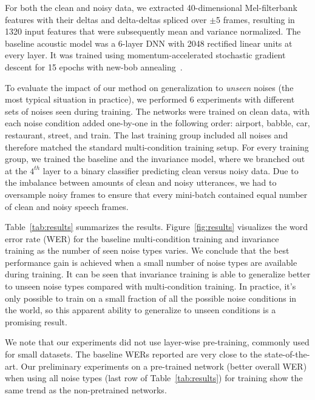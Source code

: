 \documentclass[a4paper]{article}
\begin{document}
For both the clean and noisy data, we extracted 40-dimensional Mel-filterbank features with their deltas and 
delta-deltas spliced over $\pm$5 frames, resulting in 1320 input 
features that were subsequently mean and variance normalized. The baseline
acoustic model was a 6-layer 
DNN with 2048 rectified linear units at every layer. It was trained using 
momentum-accelerated stochastic gradient descent for 15 epochs with new-bob 
annealing~\citep[the learning rate is halfed if no improvement on the validation set, as in][]{morgan1995continuous,sainath2011making}.

To evaluate the impact of our method on generalization to \emph{unseen} noises (the
most typical situation in practice),
we performed 6 experiments with different sets of noises seen during training.
The networks were trained
on clean data, with each noise condition added one-by-one in the following order: airport, babble, car, 
restaurant, street, and train. The last training group included all noises and therefore matched the
standard multi-condition training setup. For every training group, we trained the
baseline and the invariance model, where we branched out at the $4^{th}$ layer to a
binary classifier predicting clean versus noisy data. Due to the imbalance between amounts of clean and
noisy utterances, we had to oversample noisy frames to ensure that every mini-batch contained
equal number of clean and noisy speech frames.

Table~\ref{tab:results} summarizes the results. Figure~\ref{fig:results} visualizes 
the word error rate (WER) for the baseline multi-condition training and invariance training 
as the number of seen noise types varies. We conclude that the best performance
gain is achieved when a small number of noise types are available during training. 
It can be seen that invariance training is able to generalize better to unseen 
noise types compared with multi-condition training.
In practice, it's only possible to train on a small fraction of all the possible
noise conditions in the world, so this apparent ability to generalize to unseen
conditions is a promising result.

We note that our experiments did not use layer-wise pre-training, commonly used for small
datasets. The baseline WERs reported are very close to the state-of-the-art. 
Our preliminary experiments on a pre-trained network (better overall WER) when 
using all noise types (last row of Table~\ref{tab:results}) for training show 
the same trend as the non-pretrained networks.
\end{document}
